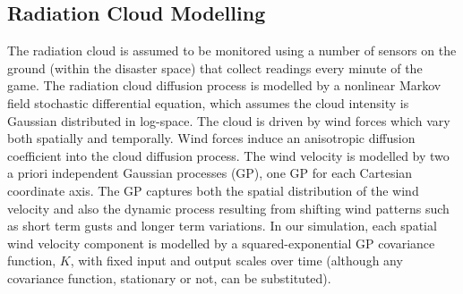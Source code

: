 \subsection{Radiation Cloud Modelling}
The radiation cloud is assumed to be monitored using a number of sensors on the ground (within the disaster space) that collect readings every minute of the game. The radiation cloud diffusion process is modelled by a nonlinear Markov field stochastic differential equation, which assumes the cloud intensity is Gaussian distributed in log-space.  The cloud is driven by wind forces which vary both spatially and temporally.  Wind forces induce an anisotropic diffusion coefficient into the cloud diffusion process.  The wind velocity is modelled by two a priori independent Gaussian processes (GP), one GP for each Cartesian coordinate axis.  The GP captures both the spatial distribution of the wind velocity and also the dynamic process resulting from shifting wind patterns such as short term gusts and longer term variations.  In our simulation, each spatial wind velocity component is modelled by a squared-exponential GP covariance function, $K$, with fixed input and output scales over time (although any covariance function, stationary or not, can be substituted).

